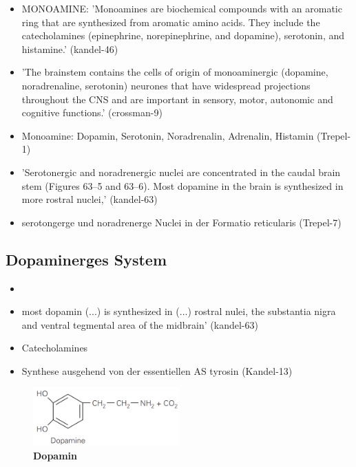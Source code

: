 \documentclass[12pt,a4paper,pdftex]{article}
\begin{document}
\begin{itemize}
    \item MONOAMINE: 'Monoamines are biochemical compounds with an aromatic ring that are synthesized from aromatic amino acids. They include the catecholamines (epinephrine, norepinephrine, and dopamine), serotonin, and histamine.' (kandel-46)
    \item 'The brainstem contains the cells of origin of monoaminergic (dopamine, noradrenaline, serotonin) neurones that have widespread projections throughout the CNS and are important in sensory, motor, autonomic and cognitive functions.' (crossman-9)
    \item Monoamine: Dopamin, Serotonin, Noradrenalin, Adrenalin, Histamin (Trepel-1)
    \item 'Serotonergic and noradrenergic nuclei are concentrated in the caudal brain stem (Figures 63–5 and 63–6). Most dopamine in the brain is synthesized in more rostral nuclei,' (kandel-63)
    \item serotongerge und noradrenerge Nuclei in der Formatio reticularis (Trepel-7)
\end{itemize}{}


\subsection{Dopaminerges System}
\label{dopaminerges_system}

\begin{itemize}
\item 
    \item most dopamin (...) is synthesized in (...) rostral nulei, the substantia nigra and ventral tegmental area of the midbrain' (kandel-63)
    \item Catecholamines
    \item Synthese ausgehend von der essentiellen AS tyrosin (Kandel-13)
\end{itemize}

\begin{figure}[H]
    \centering
    \includegraphics[width=0.5\textwidth]{pictures/Bilder_monoamine_systeme/dopamin.PNG}
    \caption{\textbf{Dopamin}}
    \label{fig:dopamin}
\end{figure}{}
\end{document}
